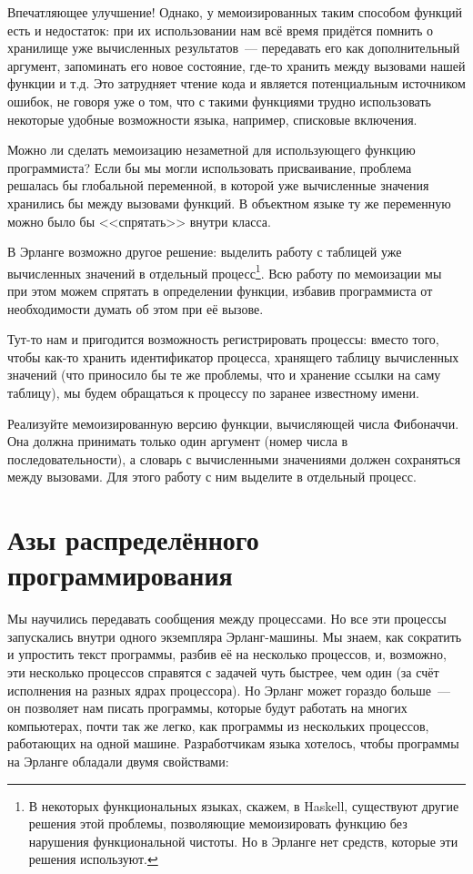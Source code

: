 \documentclass[
  paper=a4,
  fontsize=14pt,
  openany,
  appendixprefix=true
]{scrbook}
\begin{document}
Впечатляющее улучшение! Однако, у мемоизированных таким способом функций есть и недостаток: при их использовании нам всё время придётся помнить о хранилище уже вычисленных результатов~--- передавать его как дополнительный аргумент, запоминать его новое состояние, где-то хранить между вызовами нашей функции и т.д. Это затрудняет чтение кода и является потенциальным источником ошибок, не говоря уже о том, что с такими функциями трудно использовать некоторые удобные возможности языка, например, списковые включения.

Можно ли сделать мемоизацию незаметной для использующего функцию программиста? Если бы мы могли использовать присваивание, проблема решалась бы глобальной переменной, в которой уже вычисленные значения хранились бы между вызовами функций. В объектном языке ту же переменную можно было бы <<спрятать>> внутри класса.

В Эрланге возможно другое решение: выделить работу с таблицей уже вычисленных значений в отдельный процесс\footnote{В некоторых функциональных языках, скажем, в Haskell, существуют другие решения этой проблемы, позволяющие мемоизировать функцию без нарушения функциональной чистоты. Но в Эрланге нет средств, которые эти решения используют.}. Всю работу по мемоизации мы при этом можем спрятать в определении функции, избавив программиста от необходимости думать об этом при её вызове.

Тут-то нам и пригодится возможность регистрировать процессы: вместо того, чтобы как-то хранить идентификатор процесса, хранящего таблицу вычисленных значений (что приносило бы те же проблемы, что и хранение ссылки на саму таблицу), мы будем обращаться к процессу по заранее известному имени.

\begin{problem}\label{fibmem}
Реализуйте мемоизированную версию функции, вычисляющей числа Фибоначчи. Она должна принимать только один аргумент (номер числа в последовательности), а словарь с вычисленными значениями должен сохраняться между вызовами. Для этого работу с ним выделите в отдельный процесс.
\end{problem}


\section{Азы распределённого программирования}

Мы научились передавать сообщения между процессами. Но все эти процессы запускались внутри одного экземпляра Эрланг-машины. Мы знаем, как сократить и упростить текст программы, разбив её на несколько процессов, и, возможно, эти несколько процессов справятся с задачей чуть быстрее, чем один (за счёт исполнения на разных ядрах процессора). Но Эрланг может гораздо больше~--- он позволяет нам писать программы, которые будут работать на многих компьютерах, почти так же легко, как программы из нескольких процессов, работающих на одной машине. Разработчикам языка хотелось, чтобы программы на Эрланге обладали двумя свойствами:
\end{document}
